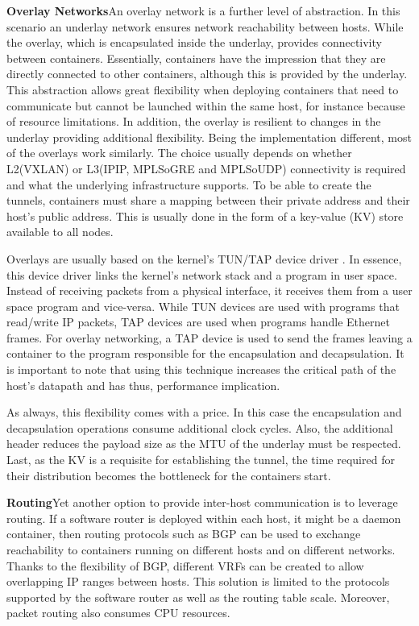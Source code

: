 \documentclass[conference]{IEEEtran}
\begin{document}
\noindent\textbf{Overlay Networks}\hspace{0.2cm}An overlay network is a further level of abstraction. In this scenario an underlay network ensures network reachability between hosts. While the overlay, which is encapsulated inside the underlay, provides connectivity between containers. Essentially, containers have the impression that they are directly connected to other containers, although this is provided by the underlay. This abstraction allows great flexibility when deploying containers that need to communicate but cannot be launched within the same host, for instance because of resource limitations. In addition, the overlay is resilient to changes in the underlay providing additional flexibility.
Being the implementation different, most of the overlays work similarly. The choice usually depends on whether L2(VXLAN) or L3(IPIP, MPLSoGRE and MPLSoUDP) connectivity is required and what the underlying infrastructure supports. To be able to create the tunnels, containers must share a mapping between their private address and their host's public address. This is usually done in the form of a key-value (KV) store available to all nodes. 

Overlays are usually based on the kernel's TUN/TAP device driver \cite{tuntap}. In essence, this device driver links the kernel's network stack and a program in user space. Instead of receiving packets from a physical interface, it receives them from a user space program and vice-versa. While TUN devices are used with programs that read/write IP packets, TAP devices are used when programs handle Ethernet frames. For overlay networking, a TAP device is used to send the frames leaving a container to the program responsible for the encapsulation and decapsulation. It is important to note that using this technique increases the critical path of the host's datapath and has thus, performance implication.

As always, this flexibility comes with a price. In this case the encapsulation and decapsulation operations consume additional clock cycles. Also, the additional header reduces the payload size as the MTU of the underlay must be respected. Last, as the KV is a requisite for establishing the tunnel, the time required for their distribution becomes the bottleneck for the containers start.

\noindent\textbf{Routing}\hspace{0.2cm}Yet another option to provide inter-host communication is to leverage routing. If a software router is deployed within each host, it might be a daemon container, then routing protocols such as BGP can be used to exchange reachability to containers running on different hosts and on different networks. Thanks to the flexibility of BGP, different VRFs can be created to allow overlapping IP ranges between hosts. This solution is limited to the protocols supported by the software router as well as the routing table scale. Moreover, packet routing also consumes CPU resources.
\end{document}
